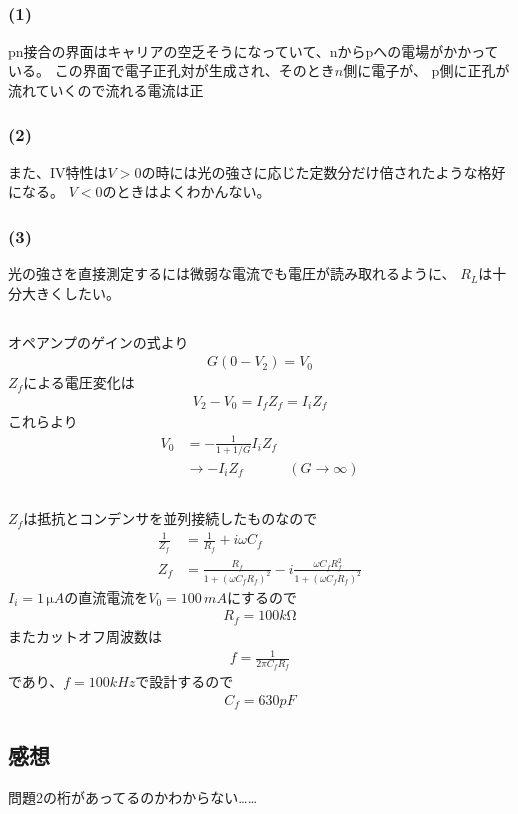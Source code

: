 \documentclass[../../master.tex]{subfiles}
\begin{document}
\subsection{}
\subsubsection{(1)}
pn接合の界面はキャリアの空乏そうになっていて、nからpへの電場がかかっている。
この界面で電子正孔対が生成され、そのとき\(n\)側に電子が、
p側に正孔が流れていくので流れる電流は正
\subsubsection{(2)}
また、IV特性は\(V>0\)の時には光の強さに応じた定数分だけ倍されたような格好になる。
\(V<0\)のときはよくわかんない。
\subsubsection{(3)}
光の強さを直接測定するには微弱な電流でも電圧が読み取れるように、
\(R_L\)は十分大きくしたい。

\subsection{}
オペアンプのゲインの式より
\begin{align}
    G(0-V_2)=V_0
\end{align}
\(Z_f\)による電圧変化は
\begin{align}
    V_2-V_0 = I_fZ_f = I_i Z_f
\end{align}
これらより
\begin{align}
    V_0 &= -\frac{1}{1+1/G}I_i Z_f\\
    &\to -I_i Z_f &(G\to \infty)
\end{align}

\subsection{}
\(Z_f\)は抵抗とコンデンサを並列接続したものなので
\begin{align}
    \frac{1}{Z_f} &= \frac{1}{R_f} + i\omega C_f\\
    Z_f &= \frac{R_f}{1+(\omega C_fR_f)^2} -i \frac{\omega C_fR_f^2}{1+(\omega C_fR_f)^2}
\end{align}
\(I_i=1\,\si{\micro A}\)の直流電流を\(V_0 = 100 \,\si{mA}\)にするので
\begin{align}
    R_f = 100 \si{k\ohm}
\end{align}
またカットオフ周波数は
\begin{align}
    f = \frac{1}{2\pi C_fR_f}
\end{align}
であり、\(f=100 \si{kHz}\)で設計するので
\begin{align}
    C_f = 630 \si{pF}
\end{align}

\subsection*{感想}
問題2の桁があってるのかわからない……
\end{document}
